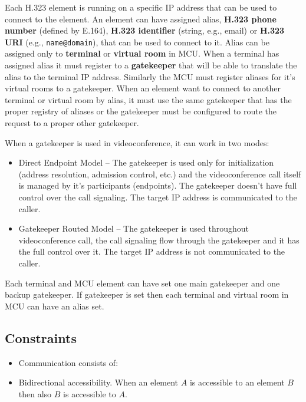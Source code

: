Each H.323 element is running on a specific IP address that can be used to 
connect to the element. An element can have assigned alias, \textbf{H.323 
phone number} (defined by E.164), \textbf{H.323 identifier} (string, e.g., 
email) or \textbf{H.323 URI} (e.g., \verb|name@domain|), that can be used to connect to it. Alias can be assigned only to \textbf{terminal} or \textbf{virtual room} in 
MCU. When a terminal has assigned alias it must register to a 
\textbf{gatekeeper} that will be able to translate the alias to the terminal 
IP address. Similarly the MCU must register aliases for it's virtual rooms to 
a gatekeeper. When an element want to connect to another terminal or virtual 
room by alias, it must use the same gatekeeper that has the proper registry 
of aliases or the gatekeeper must be configured to route the request to a 
proper other gatekeeper.

When a gatekeeper is used in videoconference, it can work in two modes:
\begin{itemize}
\item Direct Endpoint Model -- The gatekeeper is used only for initialization 
(address resolution, admission control, etc.) and the videoconference call 
itself is managed by it's participants (endpoints). The gatekeeper doesn't 
have full control over the call signaling. The target IP address is 
communicated to the caller.
\item Gatekeeper Routed Model -- The gatekeeper is used throughout 
videoconference call, the call signaling flow through the gatekeeper and it 
has the full control over it. The target IP address is not communicated to 
the caller.
\end{itemize}

Each terminal and MCU element can have set one main gatekeeper and one backup 
gatekeeper.  If gatekeeper is set then each terminal and virtual room in MCU 
can have an alias set.

\subsection{Constraints}

\begin{itemize}
\item Communication consists of:

\item Bidirectional accessibility. When an element $A$ is accessible to an 
element $B$ then also $B$ is accessible to $A$.
\end{itemize}

